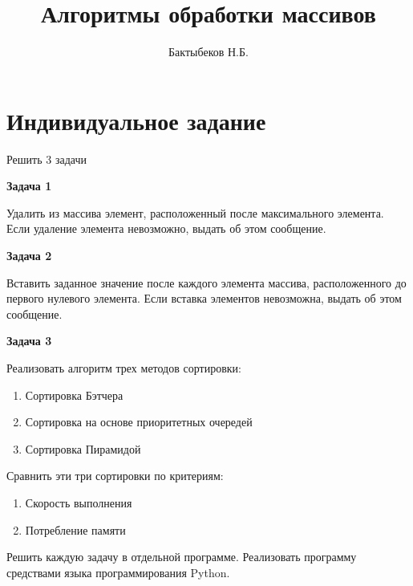 

\title{Алгоритмы обработки массивов}
\author{Бактыбеков Н.Б.}





\newpage
\tableofcontents{}
\setcounter{page}{1}

\newpage
{}


\section*{Индивидуальное задание}

Решить 3 задачи

\textbf{Задача 1}

Удалить из массива элемент, расположенный после максимального элемента. Если удаление элемента невозможно, выдать об этом сообщение.



\textbf{Задача 2}

Вставить заданное значение после каждого элемента массива, расположенного до первого нулевого элемента. Если вставка элементов невозможна, выдать об этом сообщение.



\textbf{Задача 3}

Реализовать алгоритм трех методов сортировки:

\begin{enumerate}
    \item Сортировка Бэтчера
    \item Сортировка на основе приоритетных очередей
    \item Сортировка Пирамидой
\end{enumerate}

Сравнить эти три сортировки по критериям:

\begin{enumerate}
    \item Скорость выполнения
    \item Потребление памяти
\end{enumerate}

Решить каждую задачу в отдельной программе. Реализовать программу средствами языка программирования Python.






